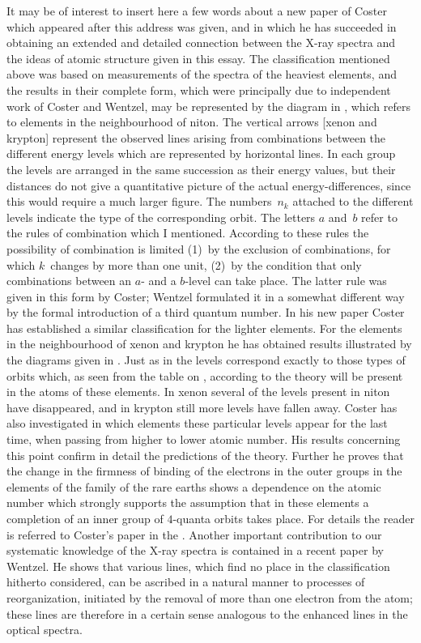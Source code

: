It may be of interest to insert here a few words about a new
paper of Coster which appeared after this address was given,
and in which he has succeeded in obtaining an extended and
detailed connection between the X-ray spectra and the ideas
of atomic structure given in this essay. The classification mentioned
above was based on measurements of the spectra of the
heaviest elements, and the results in their complete form, which
were principally due to independent work of Coster and Wentzel,
may be represented by the diagram in , which refers to
elements in the neighbourhood of niton. The vertical arrows
[xenon and krypton]
represent the observed lines arising from combinations between
the different energy levels which are represented by horizontal lines.
In each group the levels are arranged in the same succession as
their energy values, but their distances do not give a quantitative
picture of the actual energy-differences, since this would require a
much larger figure. The numbers~$n_{k}$ attached to the different levels
indicate the type of the corresponding orbit. The letters $a$ and~$b$
refer to the rules of combination which I mentioned. According
to these rules the possibility of combination is limited (1)~by the
exclusion of combinations, for which $k$~changes by more than one
unit, (2)~by the condition that only combinations between an $a$-
and a $b$-level can take place. The latter rule was given in this
form by Coster; Wentzel formulated it in a somewhat different
way by the formal introduction of a third quantum number. In
his new paper Coster has established a similar classification for the
lighter elements. For the elements in the neighbourhood of xenon
and krypton he has obtained results illustrated by the diagrams
given in . Just as in  the levels correspond exactly to
those types of orbits which, as seen from the table on ,
according to the theory will be present in the atoms of these elements.
In xenon several of the levels present in niton have disappeared,
and in krypton still more levels have fallen away. Coster
has also investigated in which elements these particular levels
appear for the last time, when passing from higher to lower atomic
number. His results concerning this point confirm in detail the
predictions of the theory. Further he proves that the change in
the firmness of binding of the electrons in the outer groups in
the elements of the family of the rare earths shows a dependence
on the atomic number which strongly supports the assumption that
in these elements a completion of an inner group of $4$-quanta
orbits takes place. For details the reader is referred to Coster's
paper in the . Another important contribution
to our systematic knowledge of the X-ray spectra is
contained in a recent paper by Wentzel. He shows that various
lines, which find no place in the classification hitherto considered,
can be ascribed in a natural manner to processes of reorganization,
initiated by the removal of more than one electron from the
atom; these lines are therefore in a certain sense analogous to
the enhanced lines in the optical spectra.

